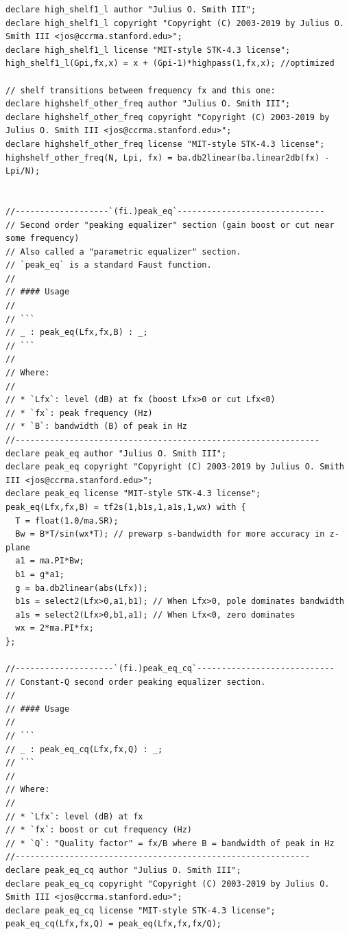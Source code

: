 \documentclass{article}
\begin{document}
\begin{lstlisting}[caption=\texttt{filters.lib}]
declare high_shelf1_l author "Julius O. Smith III";
declare high_shelf1_l copyright "Copyright (C) 2003-2019 by Julius O. Smith III <jos@ccrma.stanford.edu>";
declare high_shelf1_l license "MIT-style STK-4.3 license";
high_shelf1_l(Gpi,fx,x) = x + (Gpi-1)*highpass(1,fx,x); //optimized

// shelf transitions between frequency fx and this one:
declare highshelf_other_freq author "Julius O. Smith III";
declare highshelf_other_freq copyright "Copyright (C) 2003-2019 by Julius O. Smith III <jos@ccrma.stanford.edu>";
declare highshelf_other_freq license "MIT-style STK-4.3 license";
highshelf_other_freq(N, Lpi, fx) = ba.db2linear(ba.linear2db(fx) - Lpi/N);


//-------------------`(fi.)peak_eq`------------------------------
// Second order "peaking equalizer" section (gain boost or cut near some frequency)
// Also called a "parametric equalizer" section.
// `peak_eq` is a standard Faust function.
//
// #### Usage
//
// ```
// _ : peak_eq(Lfx,fx,B) : _;
// ```
//
// Where:
//
// * `Lfx`: level (dB) at fx (boost Lfx>0 or cut Lfx<0)
// * `fx`: peak frequency (Hz)
// * `B`: bandwidth (B) of peak in Hz
//--------------------------------------------------------------
declare peak_eq author "Julius O. Smith III";
declare peak_eq copyright "Copyright (C) 2003-2019 by Julius O. Smith III <jos@ccrma.stanford.edu>";
declare peak_eq license "MIT-style STK-4.3 license";
peak_eq(Lfx,fx,B) = tf2s(1,b1s,1,a1s,1,wx) with {
  T = float(1.0/ma.SR);
  Bw = B*T/sin(wx*T); // prewarp s-bandwidth for more accuracy in z-plane
  a1 = ma.PI*Bw;
  b1 = g*a1;
  g = ba.db2linear(abs(Lfx));
  b1s = select2(Lfx>0,a1,b1); // When Lfx>0, pole dominates bandwidth
  a1s = select2(Lfx>0,b1,a1); // When Lfx<0, zero dominates
  wx = 2*ma.PI*fx;
};

//--------------------`(fi.)peak_eq_cq`----------------------------
// Constant-Q second order peaking equalizer section.
//
// #### Usage
//
// ```
// _ : peak_eq_cq(Lfx,fx,Q) : _;
// ```
//
// Where:
//
// * `Lfx`: level (dB) at fx
// * `fx`: boost or cut frequency (Hz)
// * `Q`: "Quality factor" = fx/B where B = bandwidth of peak in Hz
//------------------------------------------------------------
declare peak_eq_cq author "Julius O. Smith III";
declare peak_eq_cq copyright "Copyright (C) 2003-2019 by Julius O. Smith III <jos@ccrma.stanford.edu>";
declare peak_eq_cq license "MIT-style STK-4.3 license";
peak_eq_cq(Lfx,fx,Q) = peak_eq(Lfx,fx,fx/Q);


\end{lstlisting}
\end{document}
